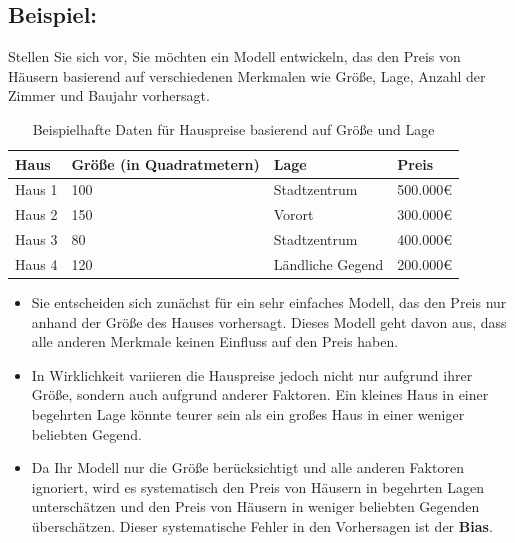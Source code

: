 \documentclass[11pt,a4paper,oneside]{scrartcl}
\begin{document}
\subsection*{Beispiel:}
Stellen Sie sich vor, Sie möchten ein Modell entwickeln, das den Preis von
Häusern basierend auf verschiedenen Merkmalen wie Größe, Lage, Anzahl der
Zimmer und Baujahr vorhersagt.

\begin{table}[h]
    \centering
    \begin{tabularx}{\textwidth}{|X|X|X|X|}
        \hline
        \textbf{Haus} & \textbf{Größe (in Quadratmetern)} & \textbf{Lage}    & \textbf{Preis} \\
        \hline
        Haus 1        & 100                               & Stadtzentrum     & 500.000€       \\
        \hline
        Haus 2        & 150                               & Vorort           & 300.000€       \\
        \hline
        Haus 3        & 80                                & Stadtzentrum     & 400.000€       \\
        \hline
        Haus 4        & 120                               & Ländliche Gegend & 200.000€       \\
        \hline
    \end{tabularx}
    \caption{Beispielhafte Daten für Hauspreise basierend auf Größe und Lage}
\end{table}

\begin{itemize}
    \item Sie entscheiden sich zunächst für ein sehr einfaches Modell,
          das den Preis nur anhand der Größe des Hauses vorhersagt.
          Dieses Modell geht davon aus, dass alle anderen Merkmale keinen
          Einfluss auf den Preis haben.
    \item In Wirklichkeit variieren die Hauspreise jedoch nicht nur aufgrund
          ihrer Größe, sondern auch aufgrund anderer Faktoren. Ein kleines Haus in einer
          begehrten Lage könnte teurer sein als ein großes Haus in einer weniger beliebten
          Gegend.
    \item Da Ihr Modell nur die Größe berücksichtigt und alle anderen Faktoren ignoriert,
          wird es systematisch den Preis von Häusern in begehrten Lagen unterschätzen und den Preis
          von Häusern in weniger beliebten Gegenden überschätzen. Dieser systematische Fehler in den
          Vorhersagen ist der \textbf{Bias}.
\end{itemize}
\end{document}
